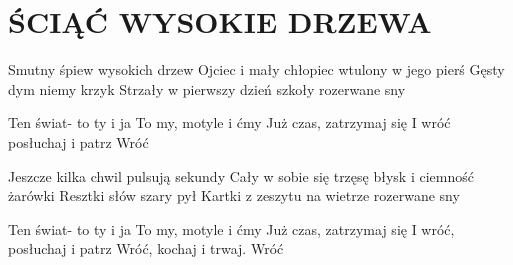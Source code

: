 \documentclass[../../../songbook.tex]{subfiles}
\begin{document}
\TabPositions{8cm} %
\section*{ŚCIĄĆ WYSOKIE DRZEWA}
{}
\vspace{0.5cm}
Smutny śpiew wysokich drzew						 \newline
Ojciec i mały chłopiec wtulony w jego pierś		 \newline
Gęsty dym niemy krzyk							 \newline
Strzały w pierwszy dzień szkoły rozerwane sny	 \newline

\-\hspace{1cm} Ten świat- to ty i ja		 \newline
\-\hspace{1cm} To my, motyle i ćmy			 \newline
\-\hspace{1cm} Już czas, zatrzymaj się		 \newline
\-\hspace{1cm} I wróć  posłuchaj i patrz 	 \newline
\-\hspace{1cm} Wróć						 \newline

Jeszcze kilka chwil pulsują sekundy \newline
Cały w sobie się trzęsę błysk i ciemność żarówki \newline
Resztki słów szary pył \newline
Kartki z zeszytu na wietrze rozerwane sny \newline

\-\hspace{1cm} Ten świat- to ty i ja			 \newline
\-\hspace{1cm} To my, motyle i ćmy				 \newline
\-\hspace{1cm} Już czas, zatrzymaj się			 \newline
\-\hspace{1cm} I wróć, posłuchaj i patrz		 \newline
\-\hspace{1cm} Wróć, kochaj i trwaj. 			 \newline
\-\hspace{1cm} Wróć							 \newline
\end{document}
